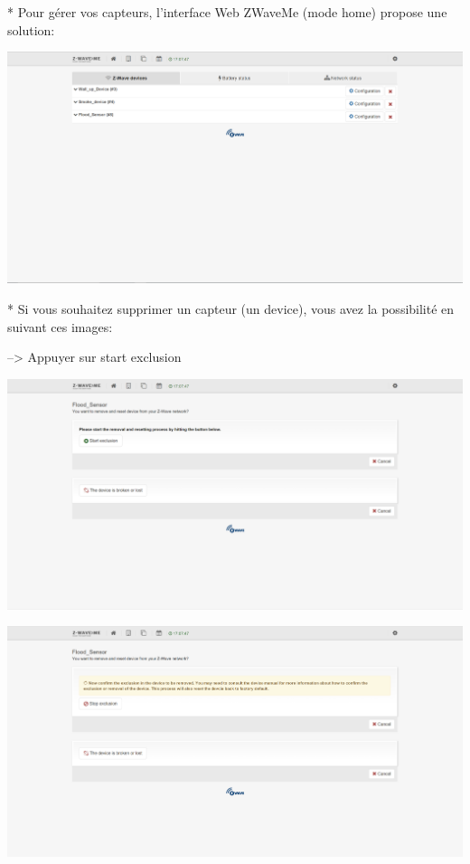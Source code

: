 * Pour gérer vos capteurs, l'interface Web ZWaveMe (mode home) propose une solution:

\includegraphics[scale=0.5]{./latex/Images/png/manage_zwaveme.png}\newline

* Si vous souhaitez supprimer un capteur (un device), vous avez la possibilité en suivant ces images:


--> Appuyer sur start exclusion


\includegraphics[scale=0.5]{./latex/Images/png/delete_zwaveme.png}\newline

\includegraphics[scale=0.5]{./latex/Images/png/exclusion_zwaveme.png}\newline

